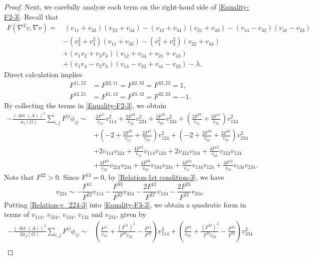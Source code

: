 \documentclass[11pt]{amsart}
\numberwithin{theorem}{section}
\numberwithin{equation}{section}
\begin{document}
\begin{proof}
Next, we carefully analyze each term on the right-hand side of \eqref{Equality-F2-3}. Recall that
\begin{align*}
F(\nabla^2v, \nabla v)
=&~(v_{11}+v_{33})(v_{22}+v_{44})-(v_{12}+v_{34})(v_{21}+v_{43})-(v_{14}-v_{32})(v_{41}-v_{23})\\
&-(v_2^2+v_4^2)(v_{11}+v_{33})-(v_1^2+v_3^2)(v_{22}+v_{44})\\
&+(v_1v_2+v_3v_4)(v_{12}+v_{34}+v_{21}+v_{43})\\
&+(v_1v_4-v_2v_3)(v_{14}-v_{32}+v_{41}-v_{23})-\lambda.
\end{align*}
Direct calculation implies
\begin{align*}
F^{11, 22}&=F^{22, 11}=F^{22, 33}=F^{33, 22}=1, \\
F^{12, 21}&=F^{21, 12}=F^{23, 32}=F^{32, 23}=-1.
\end{align*}
By collecting the terms in \eqref{Equality-F2-3}, we obtain
\begin{equation}\label{Equality-F3-3}
\begin{aligned}
-\frac{(\det(A))^2}{\sigma_3(G)}\sum_{i, j}F^{ij}\phi_{ij} \sim&~\frac{2F^{11}}{v_{11}}v_{114}^2+\frac{2F^{22}}{v_{22}}v_{224}^2+\frac{2F^{33}}{v_{33}}v_{334}^2+\left(\frac{2F^{33}}{v_{11}}+\frac{2F^{11}}{v_{33}}\right)v_{134}^2\\
&+\left(-2+\frac{2F^{22}}{v_{11}}+\frac{2F^{11}}{v_{22}}\right)v_{124}^2+\left(-2+\frac{2F^{33}}{v_{22}}+\frac{2F^{22}}{v_{33}}\right)v_{234}^2\\
&+2v_{114}v_{224}+\frac{4F^{12}}{v_{11}}v_{114}v_{124}+2v_{224}v_{334}+\frac{4F^{12}}{v_{22}}v_{224}v_{124}\\
&+\frac{4F^{23}}{v_{22}}v_{224}v_{234}+\frac{4F^{23}}{v_{33}}v_{334}v_{234}+\frac{4F^{23}}{v_{11}}v_{134}v_{124}+\frac{4F^{12}}{v_{33}}v_{134}v_{234}.
\end{aligned}
\end{equation}
Note that $F^{22}>0$. Since $F^{13}=0$, by \eqref{Relation-1st condition-3}, we have
\begin{equation}\label{Relation-v_224-3}
v_{224}\sim-\frac{F^{11}}{F^{22}}v_{114}-\frac{F^{33}}{F^{22}}v_{334}-\frac{2F^{12}}{F^{22}}v_{124}-\frac{2F^{23}}{F^{22}}v_{234}.
\end{equation}
Putting \eqref{Relation-v_224-3} into \eqref{Equality-F3-3}, we obtain a quadratic form in terms of $v_{114}$, $v_{334}$, $v_{134}$, $v_{124}$ and $v_{234}$, given by
\begin{align*}
-\frac{(\det(A))^2}{2\sigma_3(G)}\sum_{i,j}F^{ij}\phi_{ij}
\sim&\left(\frac{F^{11}}{v_{11}}+\frac{(F^{11})^2}{F^{22}v_{22}}-\frac{F^{11}}{F^{22}}\right)v_{114}^2+\left(\frac{F^{33}}{v_{33}}+\frac{(F^{33})^2}{F^{22}v_{22}}-\frac{F^{33}}{F^{22}}\right)v_{334}^2\\

\end{align*}
\end{proof}
\end{document}
